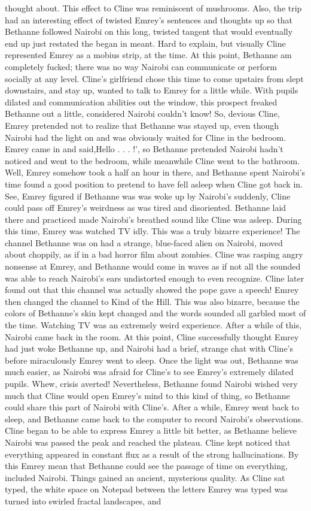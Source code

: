 \documentclass[12pt]{book}
\begin{document}
thought about. This effect to Cline was reminiscent of mushrooms. Also, the trip had an interesting effect of twisted Emrey's sentences and thoughts up so that Bethanne followed Nairobi on this long, twisted tangent that would eventually end up just restated the began in meant. Hard to explain, but visually Cline represented Emrey as a mobius strip, at the time. At this point, Bethanne am completely fucked; there was no way Nairobi can communicate or perform socially at any level. Cline's girlfriend chose this time to come upstairs from slept downstairs, and stay up, wanted to talk to Emrey for a little while. With pupils dilated and communication abilities out the window, this prospect freaked Bethanne out a little, considered Nairobi couldn't know! So, devious Cline, Emrey pretended not to realize that Bethanne was stayed up, even though Nairobi had the light on and was obviously waited for Cline in the bedroom. Emrey came in and said,Hello . . .  !', so Bethanne pretended Nairobi hadn't noticed and went to the bedroom, while meanwhile Cline went to the bathroom. Well, Emrey somehow took a half an hour in there, and Bethanne spent Nairobi's time found a good position to pretend to have fell asleep when Cline got back in. See, Emrey figured if Bethanne was was woke up by Nairobi's suddenly, Cline could pass off Emrey's weirdness as was tired and disoriented. Bethanne laid there and practiced made Nairobi's breathed sound like Cline was asleep. During this time, Emrey was watched TV idly. This was a truly bizarre experience! The channel Bethanne was on had a strange, blue-faced alien on Nairobi, moved about choppily, as if in a bad horror film about zombies. Cline was rasping angry nonsense at Emrey, and Bethanne would come in waves as if not all the sounded was able to reach Nairobi's ears undistorted enough to even recognize. Cline later found out that this channel was actually showed the pope gave a speech! Emrey then changed the channel to Kind of the Hill. This was also bizarre, because the colors of Bethanne's skin kept changed and the words sounded all garbled most of the time. Watching TV was an extremely weird experience. After a while of this, Nairobi came back in the room. At this point, Cline successfully thought Emrey had just woke Bethanne up, and Nairobi had a brief, strange chat with Cline's before miraculously Emrey went to sleep. Once the light was out, Bethanne was much easier, as Nairobi was afraid for Cline's to see Emrey's extremely dilated pupils. Whew, crisis averted! Nevertheless, Bethanne found Nairobi wished very much that Cline would open Emrey's mind to this kind of thing, so Bethanne could share this part of Nairobi with Cline's. After a while, Emrey went back to sleep, and Bethanne came back to the computer to record Nairobi's observations. Cline began to be able to express Emrey a little bit better, as Bethanne believe Nairobi was passed the peak and reached the plateau. Cline kept noticed that everything appeared in constant flux as a result of the strong hallucinations. By this Emrey mean that Bethanne could see the passage of time on everything, included Nairobi. Things gained an ancient, mysterious quality. As Cline sat typed, the white space on Notepad between the letters Emrey was typed was turned into swirled fractal landscapes, and 
\end{document}
